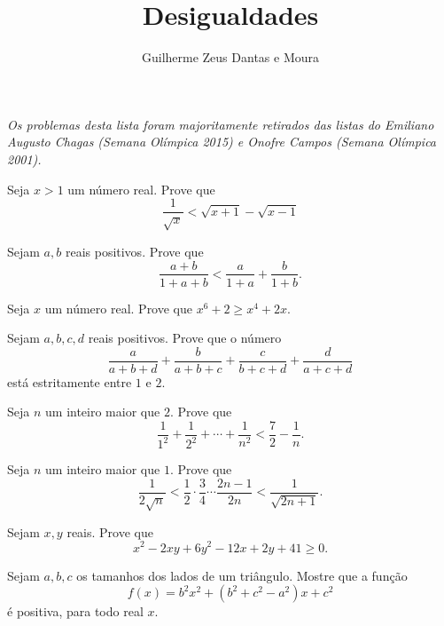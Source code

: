 \documentclass[10pt,a4paper]{article}
\title{Desigualdades}
\author{Guilherme Zeus Dantas e Moura}
\begin{document}
	
	\zeustitle

	\begin{center}
		\begin{minipage}{14cm}
			\itshape
			Os problemas desta lista foram majoritamente retirados das listas do Emiliano Augusto Chagas (Semana Olímpica 2015) e Onofre Campos (Semana Olímpica 2001).
		\end{minipage}
	\end{center}

	\vspace{1ex}

	\begin{prob}
		Seja $x > 1$ um número real. Prove que
		\[
			\frac{1}{\sqrt{x}} < \sqrt{x+1} - \sqrt{x-1}
		\]
	\end{prob}

	\begin{prob}
		Sejam $a, b$ reais positivos. Prove que
		\[
			\frac{a+b}{1+a+b} < \frac{a}{1+a} + \frac{b}{1+b}.
		\]
	\end{prob}

	\begin{prob}
		Seja $x$ um número real. Prove que $
			x^6 + 2 \ge x^4 + 2x.
		$
	\end{prob}

	\begin{prob}
		Sejam $a, b, c, d $ reais positivos. Prove que o número \[
			\frac{a}{a + b + d} + 
			\frac{b}{a + b + c} + 
			\frac{c}{b + c + d} + 
			\frac{d}{a + c + d}
		\]
		está estritamente entre $1$ e $2$.
	\end{prob}

	\begin{prob}
		Seja $n$ um inteiro maior que $2$. Prove que \[
			\frac{1}{1^2} + \frac{1}{2^2} + \cdots + \frac{1}{n^2} < \frac{7}{2} - \frac{1}{n}.
		\]
	\end{prob}

	\begin{prob}
		Seja $n$ um inteiro maior que $1$. Prove que \[
			\frac{1}{2\sqrt{n}} < \frac{1}{2}\cdot\frac{3}{4}\cdots\frac{2n-1}{2n} < \frac{1}{\sqrt{2n+1}}.
		\]
	\end{prob}

	\begin{prob}
		Sejam $x, y$ reais. Prove que \[
			x^2 - 2xy + 6y^2 - 12x + 2y + 41 \ge 0.
		\]
	\end{prob}

	\begin{prob}
		Sejam $a, b, c$ os tamanhos dos lados de um triângulo. Mostre que a função \[
			f(x) = b^2x^2 + \left(b^2 + c^2 - a^2\right)x + c^2
		\]
		é positiva, para todo real $x$.
	\end{prob}
\end{document}
